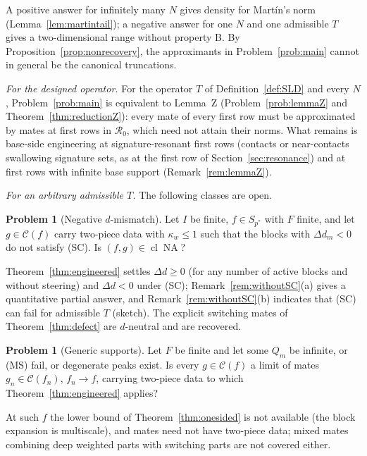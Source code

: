 \documentclass[10pt]{amsart}
\theoremstyle{definition}
\newtheorem{problem}[theorem]{Problem}
\theoremstyle{remark}
\newcommand{\NA}{\operatorname{NA}}
\newcommand{\Cset}{\mathcal C}
\newcommand{\cl}{\operatorname{cl}}
\begin{document}
A positive answer for infinitely many $N$ gives density for Mart\'in's
norm (Lemma~\ref{lem:martintail}); a negative answer for one $N$ and one
admissible $T$ gives a two-dimensional range without property B.  By
Proposition~\ref{prop:nonrecovery}, the approximants in
Problem~\ref{prob:main} cannot in general be the canonical truncations.

\emph{For the designed operator.}  For the operator $T$ of
Definition~\ref{def:SLD} and every $N$, Problem~\ref{prob:main} is
equivalent to Lemma~Z (Problem~\ref{prob:lemmaZ} and
Theorem~\ref{thm:reductionZ}): every mate of every first row must be
approximated by mates at first rows in $\mathcal R_0$, which need not attain
their norms.  What remains is base-side engineering at signature-resonant
first rows (contacts or near-contacts swallowing signature sets, as at the
first row of Section~\ref{sec:resonance}) and at first rows with infinite
base support (Remark~\ref{rem:lemmaZ}).

\emph{For an arbitrary admissible $T$.}  The following classes are open.

\begin{problem}[Negative $d$-mismatch]\label{prob:resonant}
Let $I$ be finite, $f\in S_{p^*}$ with $F$ finite, and let $g\in\Cset(f)$
carry two-piece data with $\kappa_w\le1$ such that the blocks with
$\Delta d_m<0$ do not satisfy \textup{(SC)}.  Is $(f,g)\in\cl\NA$?
\end{problem}

Theorem~\ref{thm:engineered} settles $\Delta d\ge0$ (for any number of
active blocks and without steering) and $\Delta d<0$ under \textup{(SC)};
Remark~\ref{rem:withoutSC}(a) gives a quantitative partial answer, and
Remark~\ref{rem:withoutSC}(b) indicates that \textup{(SC)} can fail for
admissible $T$ (sketch).  The explicit switching mates of
Theorem~\ref{thm:defect} are $d$-neutral and are recovered.

\begin{problem}[Generic supports]\label{prob:generic}
Let $F$ be finite and let some $Q_m$ be infinite, or \textup{(MS)} fail, or
degenerate peaks exist.  Is every $g\in\Cset(f)$ a limit of mates
$g_n\in\Cset(f_n)$, $f_n\to f$, carrying two-piece data to which
Theorem~\ref{thm:engineered} applies?
\end{problem}

At such $f$ the lower bound of Theorem~\ref{thm:onesided} is not available
(the block expansion is multiscale), and mates need not have two-piece data;
mixed mates combining deep weighted parts with switching parts are not
covered either.
\end{document}
